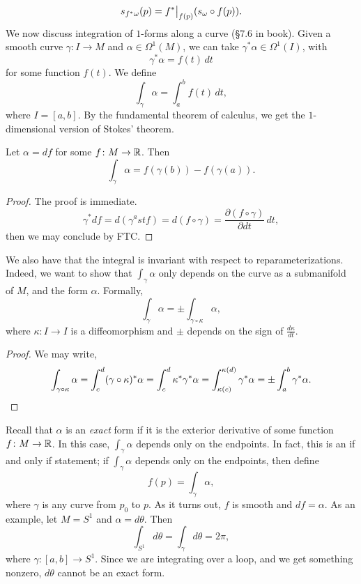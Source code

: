\[ s_{f^\ast\omega} (p) = \restr{f^\ast}{f(p)} (s_\omega \circ f(p)). \]
We now discuss integration of $1$-forms along a curve (\S7.6 in book). Given a smooth curve $\gamma \colon I \to M$ and $\alpha \in \Omega^1(M)$, we can take $\gamma^\ast \alpha \in \Omega^1(I)$, with
\[ \gamma^\ast \alpha = f(t) \, dt \]
for some function $f(t)$. We define
\[ \int_\gamma \alpha = \int_a^b f(t) \, dt, \]
where $I = [a, b]$. By the fundamental theorem of calculus, we get the $1$-dimensional version of Stokes' theorem.
\begin{theorem}[Stokes, 1D; \S7.15]
    Let $\alpha = df$ for some $f \colon M \to \mathbb R$. Then
    \[ \int_\gamma \alpha = f(\gamma(b)) - f(\gamma(a)). \]
\end{theorem}
\begin{proof}
    The proof is immediate.
    \[ \gamma^\ast df = d(\gamma^ast f) = d(f \circ \gamma) = \frac{\partial(f \circ \gamma)}{\partial dt} \, dt, \]
    then we may conclude by FTC.
\end{proof}
We also have that the integral is invariant with respect to reparameterizations. Indeed, we want to show that $\int_\gamma \alpha$ only depends on the curve as a submanifold of $M$, and the form $\alpha$. Formally,
\[ \int_\gamma \alpha = \pm \int_{\gamma \circ \kappa} \alpha, \]
where $\kappa \colon I \to I$ is a diffeomorphism and $\pm$ depends on the sign of $\frac{d\kappa}{dt}$.
\begin{proof}
    We may write,
    \[ \int_{\gamma \circ \kappa} \alpha = \int_c^d (\gamma \circ \kappa)^\ast \alpha = \int_c^d \kappa^\ast \gamma^\ast \alpha = \int_{\kappa(c)}^{\kappa(d)} \gamma^\ast \alpha = \pm \int_a^b \gamma^\ast \alpha. \qedhere \]
\end{proof}
Recall that $\alpha$ is an \textit{exact} form if it is the exterior derivative of some function $f \colon M \to \mathbb R$. In this case, $\int_\gamma \alpha$ depends only on the endpoints. In fact, this is an if and only if statement; if $\int_\gamma \alpha$ depends only on the endpoints, then define
\[ f(p) = \int_\gamma \alpha, \]
where $\gamma$ is any curve from $p_0$ to $p$. As it turns out, $f$ is smooth and $df = \alpha$. As an example, let $M = S^1$ and $\alpha = d\theta$. Then
\[ \int_{S^1} d\theta = \int_\gamma d\theta = 2\pi, \]
where $\gamma \colon [a, b] \to S^1$. Since we are integrating over a loop, and we get something nonzero, $d\theta$ cannot be an exact form.
